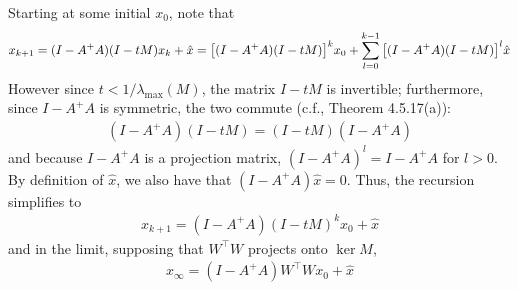 \documentclass[12pt]{article}
\begin{document}
Starting at some initial \(x_0\),
note that
\begin{align*}
  x_{k + 1}
    = (I - A^+ A) (I - tM) x_k + \hat{x}
    = {\left[(I - A^+ A) (I - tM)\right]}^k x_0
        + \sum_{l = 0}^{k - 1} {\left[(I - A^+ A) (I - tM)\right]}^l \hat{x}
\end{align*}
However since \(t < 1 / \lambda_{\max} (M)\),
the matrix \(I - tM\) is invertible;
furthermore, since \(I - A^+ A\) is symmetric,
the two commute (c.f., \cite{horn2012matrix} Theorem 4.5.17(a)):
\begin{align*}
  (I - A^+ A) (I - tM)
    = (I - tM) (I - A^+ A)
\end{align*}
and because \(I - A^+ A\) is a projection matrix,
\((I - A^+ A)^l = I - A^+ A\) for \(l > 0\).
By definition of \(\hat{x}\),
we also have that \((I - A^+ A) \hat{x} = 0\).
Thus, the recursion simplifies to
\begin{align*}
  x_{k + 1}
    = (I - A^+ A) (I - tM)^k x_0 + \hat{x}
\end{align*}
and in the limit, supposing that \(W^\top W\) projects onto \(\ker M\),
\begin{align*}
  x_{\infty} = (I - A^+ A) W^\top W x_0 + \hat{x}
\end{align*}


\printbibliography
\end{document}

